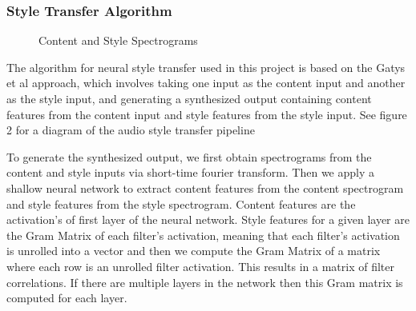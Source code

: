 \documentclass[10pt,twocolumn,letterpaper]{article}
\begin{document}
\subsubsection{Style Transfer Algorithm}

\begin{figure}
\begin{center}
\end{center}
   \caption{Content and Style Spectrograms}
\label{fig:short}
\end{figure}

The algorithm for neural style transfer used in this project is based on the Gatys et al\cite{Authors00001} approach, which involves taking one input as the content input and another as the style input, and generating a synthesized output containing content features from the content input and style features from the style input. See figure 2 for a diagram of the audio style transfer pipeline

To generate the synthesized output, we first obtain spectrograms from the content and style inputs via short-time fourier transform. Then we apply a shallow neural network to extract content features from the content spectrogram and style features from the style spectrogram. Content features are the activation's of first layer of the neural network. Style features for a given layer are the Gram Matrix of each filter’s activation, meaning that each filter’s activation is unrolled into a vector and then we compute the Gram Matrix of a matrix where each row is an unrolled filter activation. This results in a matrix of filter correlations. If there are multiple layers in the network then this Gram matrix is 
computed for each layer.
\end{document}
